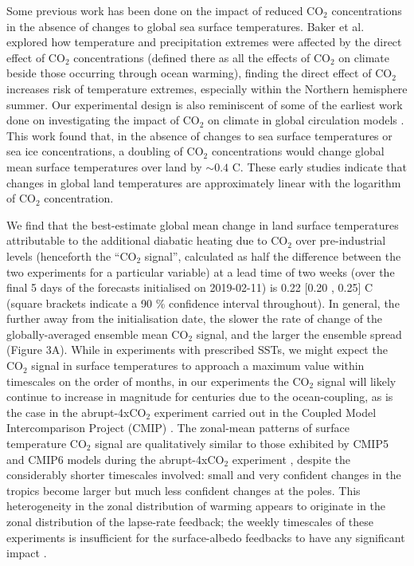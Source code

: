   Some previous work has been done on the impact of reduced CO$_2$ concentrations in the absence of changes to global sea surface temperatures. Baker et al. \citep{baker_higher_2018} explored how temperature and precipitation extremes were affected by the direct effect of CO$_2$ concentrations (defined there as all the effects of CO$_2$ on climate beside those occurring through ocean warming), finding the direct effect of CO$_2$ increases risk of temperature extremes, especially within the Northern hemisphere summer. Our experimental design is also reminiscent of some of the earliest work done on investigating the impact of CO$_2$ on climate in global circulation models \citep{gates_preliminary_1981,mitchell_seasonal_1983}. This work found that, in the absence of changes to sea surface temperatures or sea ice concentrations, a doubling of CO$_2$ concentrations would change global mean surface temperatures over land by $\sim0.4$ \degree C. These early studies indicate that changes in global land temperatures are approximately linear with the logarithm of CO$_2$ concentration.
  
  We find that the best-estimate global mean change in land surface temperatures attributable to the additional diabatic heating due to CO$_2$ over pre-industrial levels (henceforth the ``CO$_2$ signal'', calculated as half the difference between the two experiments for a particular variable) at a lead time of two weeks (over the final 5 days of the forecasts initialised on 2019-02-11) is 0.22 [0.20 , 0.25] \degree C (square brackets indicate a 90 \% confidence interval throughout). In general, the further away from the initialisation date, the slower the rate of change of the globally-averaged ensemble mean CO$_2$ signal, and the larger the ensemble spread (Figure 3A). While in experiments with prescribed SSTs, we might expect the CO$_2$ signal in surface temperatures to approach a maximum value within timescales on the order of months, in our experiments the CO$_2$ signal will likely continue to increase in magnitude for centuries due to the ocean-coupling, as is the case in the abrupt-4xCO$_2$ experiment carried out in the Coupled Model Intercomparison Project (CMIP) \citep{taylor_overview_2012,eyring_overview_2016,rugenstein_equilibrium_2020}. The zonal-mean patterns of surface temperature CO$_2$ signal are qualitatively similar to those exhibited by CMIP5 and CMIP6 models during the abrupt-4xCO$_2$ experiment \citep{flynn_climate_2020,andrews_dependence_2015}, despite the considerably shorter timescales involved: small and very confident changes in the tropics become larger but much less confident changes at the poles. This heterogeneity in the zonal distribution of warming appears to originate in the zonal distribution of the lapse-rate feedback; the weekly timescales of these experiments is insufficient for the surface-albedo feedbacks to have any significant impact \citep{smith_polar_2019}.
  
